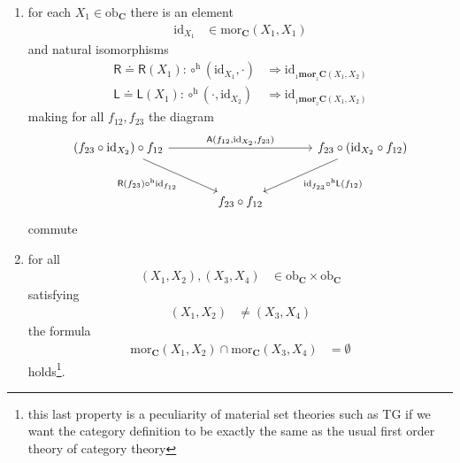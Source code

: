 \begin{enumerate}
\begin{enumerate}
\[\begin{tikzcd}[row sep=3.5em,column sep=0.4em]
  \left(
    (f_{34} \circ f_{23})
    \circ
    f_{12}
  \right)
  \arrow[swap]{u}{\mathrm{id}_{f_{45}} \circ^{\textrm{h}} \mathsf{A}(f_{12},f_{23},f_{34})}
\end{tikzcd}
\]
commute
\item[(WC2)]
for each $X_{1} \in \mathrm{ob}_{\mathbf{C}}$ there is an element
\begin{align*}
  \mathrm{id}_{X_{1}}
  &\in
  \mathrm{mor}_{\mathbf{C}}(X_{1},X_{1})
\end{align*}
and natural isomorphisms
\begin{align*}
  \mathsf{R}
  \doteq
  \mathsf{R}(X_{1})
  \colon
  \circ^{\textrm{h}}(\mathrm{id}_{X_{1}},\cdot)
  &\Rightarrow
  \mathrm{id}_{{}_{1}\mathbf{mor}_{{}_{2}}\mathbf{C}(X_{1},X_{2})}
  \\
  \mathsf{L}
  \doteq
  \mathsf{L}(X_{1})
  \colon
  \circ^{\textrm{h}}(\cdot,\mathrm{id}_{X_{2}})
  &\Rightarrow
  \mathrm{id}_{{}_{1}\mathbf{mor}_{{}_{2}}\mathbf{C}(X_{1},X_{2})}
\end{align*}
making for all $f_{12},f_{23}$ the diagram
\[
\begin{tikzcd}[sep=large]
  \left(
    f_{23}
    \circ
    \mathrm{id}_{X_{2}}
  \right)
  \circ
  f_{12}
  \arrow{rr}{\mathsf{A}(f_{12},\mathrm{id}_{X_{2}},f_{23})}
  \arrow[swap]{dr}{\mathsf{R}(f_{23}) \circ^{\textrm{h}} \mathrm{id}_{f_{12}}}
  &
  &
  f_{23}
  \circ
  \left(
    \mathrm{id}_{X_{2}}
    \circ
    f_{12}
  \right)
  \arrow{dl}{\mathrm{id}_{f_{23}} \circ^{\textrm{h}} \mathsf{L}(f_{12})}
  \\
  &
  f_{23}
  \circ
  f_{12}
  &
\end{tikzcd}
\]
commute
\item[(WC3)]
for all
\begin{align*}
  (X_{1},X_{2}),(X_{3},X_{4})
  &\in
  \mathrm{ob}_{\mathbf{C}}
  \times
  \mathrm{ob}_{\mathbf{C}}
\end{align*}
satisfying
\begin{align*}
  (X_{1},X_{2})
  &\neq
  (X_{3},X_{4})
\end{align*}
the formula
\begin{align*}
  \mathrm{mor}_{\mathbf{C}}(X_{1},X_{2})
  \cap
  \mathrm{mor}_{\mathbf{C}}(X_{3},X_{4})
  &=
  \emptyset
\end{align*}
holds\footnote{this last property is a peculiarity of material set theories such as TG if we want the category definition to be exactly the same as the usual first order theory of category theory}.
\end{enumerate}

\end{enumerate}
